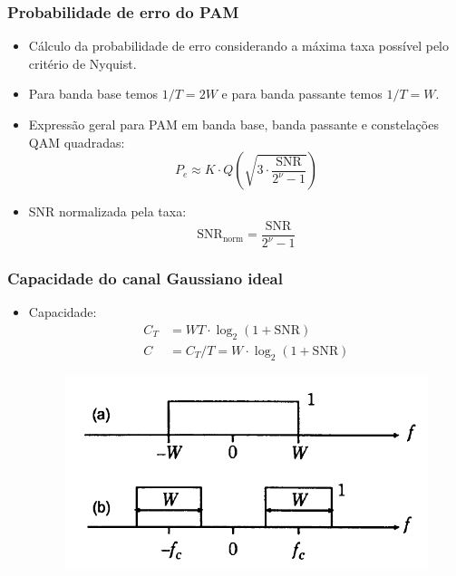 \begin{frame}
	\frametitle{Probabilidade de erro do PAM}

	\begin{itemize}
	    \item Cálculo da probabilidade de erro considerando a máxima taxa possível pelo critério de Nyquist.
	    \item Para banda base temos $1/T = 2W$ e para banda passante temos $1/T = W$.
	    \item Expressão geral para PAM em banda base, banda passante e constelações QAM quadradas:
	    \begin{equation*}
		P_e \approx K \cdot Q \left(\sqrt{3\cdot \frac{\text{SNR}}{2^{\nu}-1}} \right)
	    \end{equation*}
	    \item SNR normalizada pela taxa:
	    \begin{equation*}
		\text{SNR}_{\text{norm}} = \frac{\text{SNR}}{2^{\nu}-1}
	    \end{equation*}

	\end{itemize}
\end{frame}

\begin{frame}
	\frametitle{Capacidade do canal Gaussiano ideal}

	\begin{itemize}
	    \item Capacidade:
	    \begin{align*}
		C_T &= WT \cdot \log_2(1+\text{SNR}) \\
		C &= C_T/T = W \cdot \log_2(1+\text{SNR})
	    \end{align*}
	    \begin{figure}[t]	
		\begin{center}
		\includegraphics[width=0.55\columnwidth]{figs/adv_29}
		\end{center}
	    \end{figure}
	\end{itemize}
\end{frame}

